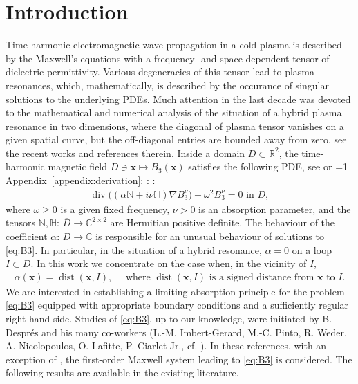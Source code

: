 \documentclass[report]{elsarticle}
\numberwithin{theorem}{section}
\newcommand{\bx}{\mathbf{x}}
\renewcommand{\vec}[1]{\mathbf{#1}}
\newcommand{\isreport}{1}
\newcommand{\citeappendixmodel}{
	\ifnum\isreport=1
	Appendix~\ref{appendix:derivation}:
	\else
	\cite[Appendix A]{mk_peillon}:
	\fi
}
\begin{document}
\section{Introduction}
Time-harmonic electromagnetic wave propagation in a cold plasma is described by the Maxwell's equations with a frequency- and space-dependent tensor of dielectric permittivity. Various degeneracies of this tensor lead to plasma resonances, which, mathematically, is described by the occurance of singular solutions to the underlying PDEs. Much attention in the last decade was devoted to the mathematical and numerical analysis of the situation of a hybrid plasma resonance in two dimensions, where the diagonal of plasma tensor vanishes on a given spatial curve, but the off-diagonal entries are bounded away from zero, see the recent works \cite{MR3192426, nicolopoulos} and references therein. Inside a domain $D\subset \mathbb{R}^2$, the time-harmonic magnetic field $D\ni\vec{x}\mapsto B_3(\vec{x})$ satisfies the following PDE, see \cite{nicolopoulos,ciarlet_mk_peillon} or \citeappendixmodel:
\begin{align}
	\label{eq:B3}
	\operatorname{div}\big((\alpha\mathbb{N}+i\nu\mathbb{H})\nabla B_3^{\nu}\big)-\omega^2 B_3^{\nu}=0 \text { in }D,
\end{align}
where $\omega\geq 0$ is a given fixed frequency, $\nu>0$ is an absorption parameter, and the tensors $\mathbb{N}, \mathbb{H}: \, \overline{D}\rightarrow \mathbb{C}^{2\times 2}$ are Hermitian positive definite. The behaviour of the coefficient $\alpha: \, D\rightarrow \mathbb{C}$ is responsible for an unusual behaviour of solutions to \eqref{eq:B3}.  In particular, in the situation of a hybrid resonance, $\alpha=0$ on a loop $I\subset D$. In this work we concentrate on the case when, in the vicinity of $I$,  
\begin{align*}
	\alpha(\bx)=\operatorname{dist}(\bx,I),\quad  \text{ 	where $\operatorname{dist}(\bx,I)$ is a signed distance from $\bx$ to $I$.}
\end{align*}
We are interested in establishing a limiting absorption principle for the problem \eqref{eq:B3} equipped with appropriate boundary conditions and a sufficiently regular right-hand side. Studies of \eqref{eq:B3}, up to our knowledge, were initiated by B. Despr\'es and his many co-workers (L.-M. Imbert-Gerard, M.-C. Pinto, R. Weder, A. Nicolopoulos, O. Lafitte, P. Ciarlet Jr., cf. \cite{MR3192426,DESPRES20161284,imbertgerard2013Mathematical,MR3959808,nicolopoulos,MR3705789,MR3517445,MR3611102,nicolopoulos_phd}).  In these references, with an exception of \cite{nicolopoulos}, the first-order Maxwell system leading to \eqref{eq:B3} is considered. The following results are available in the existing literature. 
\end{document}
